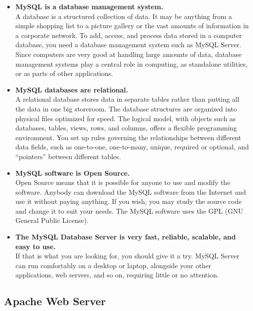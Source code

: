 \begin{itemize}
\item {\bf MySQL is a database management system.}\\
A database is a structured collection of data. It may be anything from
a simple shopping list to a picture gallery or the vast amounts of
information in a corporate network. To add, access, and process data
stored in a computer database, you need a database management system
such as MySQL Server. Since computers are very good at handling large
amounts of data, database management systems play a central role in
computing, as standalone utilities, or as parts of other applications. 

\item {\bf MySQL databases are relational.}\\
A relational database stores data in separate tables rather than
putting all the data in one big storeroom. The database structures are
organized into physical files optimized for speed. The logical model,
with objects such as databases, tables, views, rows, and columns,
offers a flexible programming environment. You set up rules governing
the relationships between different data fields, such as one-to-one,
one-to-many, unique, required or optional, and “pointers” between
different tables.

\item {\bf MySQL software is Open Source.}\\
Open Source means that it is possible for anyone to use and modify the
software. Anybody can download the MySQL software from the Internet
and use it without paying anything. If you wish, you may study the
source code and change it to suit your needs. The MySQL software uses
the GPL (GNU General Public License).

\item {\bf The MySQL Database Server is very fast, reliable, scalable,
and easy to use.}\\
If that is what you are looking for, you should give it a try. MySQL
Server can run comfortably on a desktop or laptop, alongside your
other applications, web servers, and so on, requiring little or no
attention.

\end{itemize}

\newpage

\subsection{Apache Web Server}

